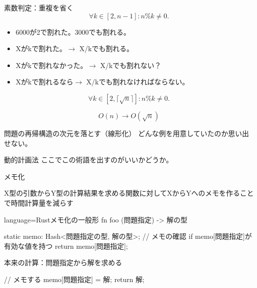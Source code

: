 \documentclass{beamer}
\begin{document}
\begin{frame}[fragile]{素数判定：重複を省く}{}
\[
\forall k \in [2, n-1] : n \% k \ne 0.
\]

\begin{itemize}%
\item 6000が2で割れた。3000でも割れる。
\item Xがkで割れた。$\to$ X/kでも割れる。
\item Xがkで割れなかった。$\to$ X/kでも割れない？
\item Xがkで割れるなら$\to$ X/kでも割れなければならない。
\end{itemize}

\[
\forall k \in [2, \lceil\sqrt{n}\rceil] : n \% k \ne 0.
\]

\[
O(n) \to O(\sqrt{n})
\]
\end{frame}

\begin{frame}[fragile]{問題の再帰構造の次元を落とす（線形化）}{}
どんな例を用意していたのか思い出せない。
\end{frame}

\begin{frame}[fragile]{動的計画法}{}
ここでこの術語を出すのがいいかどうか。
\end{frame}

\begin{frame}[fragile]{メモ化}{
}

X型の引数からY型の計算結果を求める関数に対してXからYへのメモを作ることで時間計算量を減らす
\begin{codeof}{language=Rust}{メモ化の一般形}
fn foo (問題指定) -> 解の型 {
  static memo: Hash<問題指定の型, 解の型>;
  // メモの確認
  if memo[問題指定]が有効な値を持つ {
    return memo[問題指定];
  }

   本来の計算：問題指定から解を求める

  // メモする
  memo[問題指定] = 解;
  return 解;
}
\end{codeof}

\end{frame}
\end{document}
